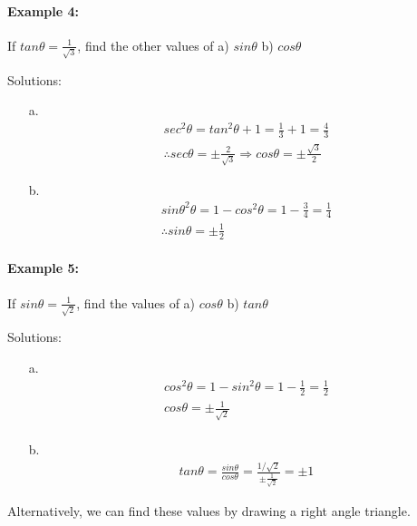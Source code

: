\documentclass{article}
\begin{document}
\paragraph{Example 4:}
If $tan\theta = \frac{1}{\sqrt{3}}$, find the other values of a) $sin\theta$ b) $cos\theta$

{\small Solutions:}
\begin{enumerate}
        \item[a.]
        \[
        \begin{aligned}
          sec^{2}\theta = tan^{2}\theta + 1 = \frac{1}{3}+1 = \frac{4}{3} \\
          \therefore sec\theta = \pm\frac{2}{\sqrt{3}} \Rightarrow cos\theta = \pm \frac{\sqrt{3}}{2}
        \end{aligned}
        \]

        \item[b.]
        \[
        \begin{aligned}
          sin\theta^{2}\theta = 1 - cos^{2}\theta = 1 - \frac{3}{4} = \frac{1}{4} \\
          \therefore sin\theta = \pm\frac{1}{2}
        \end{aligned}
        \]
\end{enumerate}

\paragraph{Example 5:}
If $sin\theta = \frac{1}{\sqrt{2}}$, find the values of a) $cos\theta$ b) $tan\theta$

{\small Solutions:}
\begin{enumerate}
        \item[a.]
        \[
        \begin{aligned}
          cos^{2}\theta = 1 - sin^{2}\theta = 1 - \frac{1}{2} = \frac{1}{2} \\
          cos\theta = \pm\frac{1}{\sqrt{2}} \\
        \end{aligned}
        \]

        \item[b.]
        \[
        \begin{aligned}
          tan\theta = \frac{sin\theta}{cos\theta} = \frac{1/\sqrt{2}}{\pm\frac{1}{\sqrt{2}}} = \pm 1
        \end{aligned}
        \]
\end{enumerate}

Alternatively, we can find these values by drawing a right angle triangle.
\end{document}
